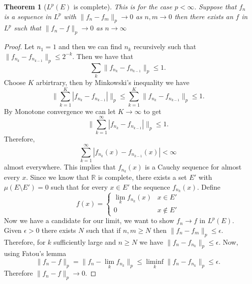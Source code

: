 \documentclass[11pt]{article}
\newtheorem{thm}{Theorem}[section]
\theoremstyle{definition}
\theoremstyle{remark}
\begin{document}
\begin{thm}[$L^p(E)$ is complete] This is for the case $p<\infty$.
Suppose that $f_n$ is a sequence in $L^p$ with $\|f_n - f_m\|_p \rightarrow 0$ as $n,m \rightarrow 0$ then there exists an $f$ in $L^p$ such that $\|f_n -f\|_p \rightarrow 0$ as $n \rightarrow \infty$
\end{thm}
\begin{proof}
Let $n_1 = 1$ and then we can find $n_k$ recursively such that $\|f_{n_k}-f_{n_{k-1}}\|_p \leq 2^{-k}$. Then we have that 
\[ \sum_k \|f_{n_k}-f_{n_{k-1}}\|_p \leq 1. \] Choose $K$ arbirtrary, then by Minkowski's inequality we have
\[ \| \sum_{k=1}^K |f_{n_k}-f_{n_{k-1}}| \|_p \leq  \sum_{k=1}^K \|f_{n_k}- f_{n_{k-1}}\|_p \leq 1.\] By Monotone convergence we can let $K \rightarrow \infty$ to get
\[ \| \sum_{k=1}^\infty |f_{n_k} - f_{n_{k-1}}| \|_p \leq 1. \] Therefore,
\[ \sum_{k=1}^\infty |f_{n_k}(x) -f_{n_{k-1}}(x)| < \infty \] almost everywhere. This implies that $f_{n_k}(x)$ is a Cauchy sequence for almost every $x$. Since we know that $\mathbb{R}$ is complete, there exists a set $E'$ with $\mu(E\setminus E')=0$ such that for every $x \in E'$ the sequence $f_{n_k}(x)$. Define
\[ f(x) = \left\{ \begin{array}{ll} \lim_k f_{n_k}(x) & x \in E' \\ 0 & x \notin E' \end{array}\right. \] Now we have a candidate for our limit, we want to show $f_n \rightarrow f$ in $L^p(E)$. Given $\epsilon >0$ there exists $N$ such that if $n, m \geq N$ then $\|f_n -f_m\|_p \leq \epsilon$. Therefore, for $k$ sufficiently large and $n \geq N$ we have $\|f_n - f_{n_k}\|_p \leq \epsilon$. Now, using Fatou's lemma
\[ \|f_n -f\|_p = \|f_n - \lim_k f_{n_k}\|_p \leq \liminf_k \|f_n - f_{n_k}\|_p \leq \epsilon. \] Therefore $\|f_n - f\|_p \rightarrow 0.$
\end{proof}
\end{document}
